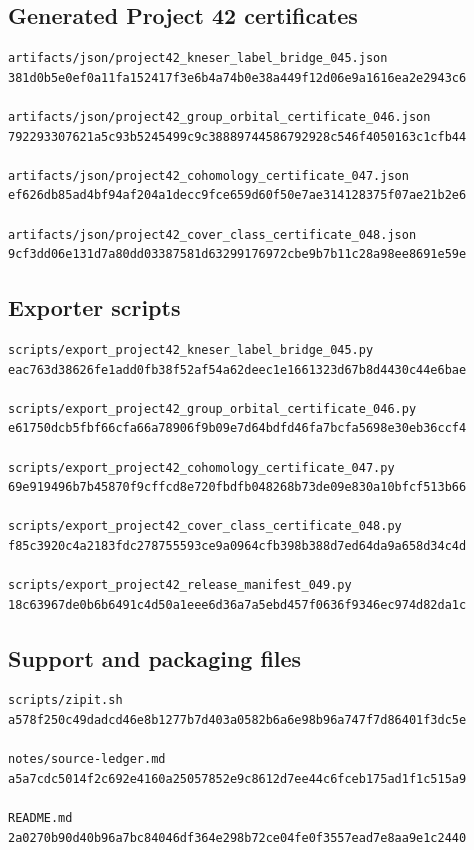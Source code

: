 \subsection{Generated Project 42 certificates}

\begin{verbatim}
artifacts/json/project42_kneser_label_bridge_045.json
381d0b5e0ef0a11fa152417f3e6b4a74b0e38a449f12d06e9a1616ea2e2943c6

artifacts/json/project42_group_orbital_certificate_046.json
792293307621a5c93b5245499c9c38889744586792928c546f4050163c1cfb44

artifacts/json/project42_cohomology_certificate_047.json
ef626db85ad4bf94af204a1decc9fce659d60f50e7ae314128375f07ae21b2e6

artifacts/json/project42_cover_class_certificate_048.json
9cf3dd06e131d7a80dd03387581d63299176972cbe9b7b11c28a98ee8691e59e
\end{verbatim}

\subsection{Exporter scripts}

\begin{verbatim}
scripts/export_project42_kneser_label_bridge_045.py
eac763d38626fe1add0fb38f52af54a62deec1e1661323d67b8d4430c44e6bae

scripts/export_project42_group_orbital_certificate_046.py
e61750dcb5fbf66cfa66a78906f9b09e7d64bdfd46fa7bcfa5698e30eb36ccf4

scripts/export_project42_cohomology_certificate_047.py
69e919496b7b45870f9cffcd8e720fbdfb048268b73de09e830a10bfcf513b66

scripts/export_project42_cover_class_certificate_048.py
f85c3920c4a2183fdc278755593ce9a0964cfb398b388d7ed64da9a658d34c4d

scripts/export_project42_release_manifest_049.py
18c63967de0b6b6491c4d50a1eee6d36a7a5ebd457f0636f9346ec974d82da1c
\end{verbatim}

\subsection{Support and packaging files}

\begin{verbatim}
scripts/zipit.sh
a578f250c49dadcd46e8b1277b7d403a0582b6a6e98b96a747f7d86401f3dc5e

notes/source-ledger.md
a5a7cdc5014f2c692e4160a25057852e9c8612d7ee44c6fceb175ad1f1c515a9

README.md
2a0270b90d40b96a7bc84046df364e298b72ce04fe0f3557ead7e8aa9e1c2440
\end{verbatim}

